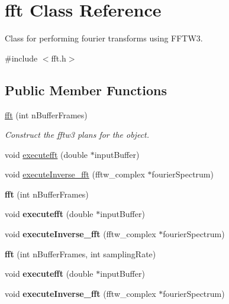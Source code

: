 \hypertarget{classfft}{\section{fft Class Reference}
\label{classfft}
}


Class for performing fourier transforms using F\-F\-T\-W3.  




{\ttfamily \#include $<$fft.\-h$>$}

\subsection*{Public Member Functions}
\begin{DoxyCompactItemize}
\item 
\hypertarget{classfft_a5fff94ac07119207ddd05f628be5891d}{\hyperlink{classfft_a5fff94ac07119207ddd05f628be5891d}{fft} (int n\-Buffer\-Frames)}\label{classfft_a5fff94ac07119207ddd05f628be5891d}

\begin{DoxyCompactList}\small\item\em Construct the fftw3 plans for the object. \end{DoxyCompactList}\item 
void \hyperlink{classfft_a47e58fd4f715ad89a6fad8df9d715bf4}{executefft} (double $\ast$input\-Buffer)
\item 
void \hyperlink{classfft_a228bd861564c189cd7b6800c950a1c09}{execute\-Inverse\-\_\-fft} (fftw\-\_\-complex $\ast$fourier\-Spectrum)
\item 
\hypertarget{classfft_a5fff94ac07119207ddd05f628be5891d}{{\bfseries fft} (int n\-Buffer\-Frames)}\label{classfft_a5fff94ac07119207ddd05f628be5891d}

\item 
\hypertarget{classfft_a47e58fd4f715ad89a6fad8df9d715bf4}{void {\bfseries executefft} (double $\ast$input\-Buffer)}\label{classfft_a47e58fd4f715ad89a6fad8df9d715bf4}

\item 
\hypertarget{classfft_a228bd861564c189cd7b6800c950a1c09}{void {\bfseries execute\-Inverse\-\_\-fft} (fftw\-\_\-complex $\ast$fourier\-Spectrum)}\label{classfft_a228bd861564c189cd7b6800c950a1c09}

\item 
\hypertarget{classfft_a57f8fc9224851c0a827b3d46102f1623}{{\bfseries fft} (int n\-Buffer\-Frames, int sampling\-Rate)}\label{classfft_a57f8fc9224851c0a827b3d46102f1623}

\item 
\hypertarget{classfft_a47e58fd4f715ad89a6fad8df9d715bf4}{void {\bfseries executefft} (double $\ast$input\-Buffer)}\label{classfft_a47e58fd4f715ad89a6fad8df9d715bf4}

\item 
\hypertarget{classfft_a228bd861564c189cd7b6800c950a1c09}{void {\bfseries execute\-Inverse\-\_\-fft} (fftw\-\_\-complex $\ast$fourier\-Spectrum)}\label{classfft_a228bd861564c189cd7b6800c950a1c09}

\end{DoxyCompactItemize}

